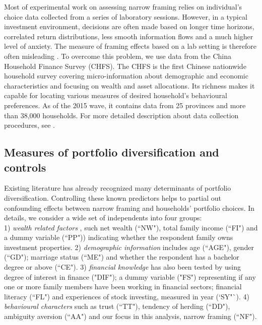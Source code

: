 \documentclass[ukenglish,nottitlepage,thmsb,11pt,letterpaper]{article}
\begin{document}
Most of experimental work on assessing narrow framing relies on individual's choice data collected from a series of laboratory sessions. However, in a typical investment environment, decisions are often made based on longer time horizons, correlated return distributions, less smooth information flows and a much higher level of anxiety. The measure of framing effects based on a lab setting is therefore often misleading \citep{Beshears2016}. To overcome this problem, we use data from the China Household Finance Survey (CHFS). The CHFS is the first Chinese nationwide household survey covering micro-information about demographic and economic characteristics and focusing on wealth and asset allocations. Its richness makes it capable for locating various measures of desired household's behavioural preferences. As of the 2015 wave, it contains data from 25 provinces and more than 38,000 households. For more detailed description about data collection procedures, see \citet{Gan2013}.

\subsection{Measures of portfolio diversification and controls}

Existing literature has already recognized many determinants of portfolio diversification. Controlling these known predictors helps to partial out confounding effects between narrow framing and households' portfolio choices. In details, we consider a wide set of independents into four groups: \\ 
 1) \textit{wealth related factors} \citep[e.g.,][]{Mankiw1991,Poterba2003,Calvet2007,Cocco2005}, such net wealth (``NW"), total family income (``FI") and a dummy variable (``PP")) indicating whether the respondent family owns investment properties.  2) \textit{demographic information} \citep{Campbell2006} includes age (``AGE"), gender (``GD"); marriage status (``ME") and whether the respondent has a bachelor degree or above (``CE"). 3) \textit{financial knowledge} \citep[e.g.,][]{Hibbert2012,Fuertes2014,Balloch2014,Gaudecker2015} has also been tested by using degree of interest in finance ("DIF"); a dummy variable ("FS") representing if any one or more family members have been working in financial sectors; financial literacy (``FL") and experiences of stock investing, measured in year (`SY"`). 4) \textit{behavioural characters} \citep{Guiso2008, Fuertes2014,Gaudecker2015, Dimmock2016} such as trust (``TT"), tendency of herding (``DD"), ambiguity aversion (``AA") and our focus in this analysis, narrow framing (``NF").
\end{document}
